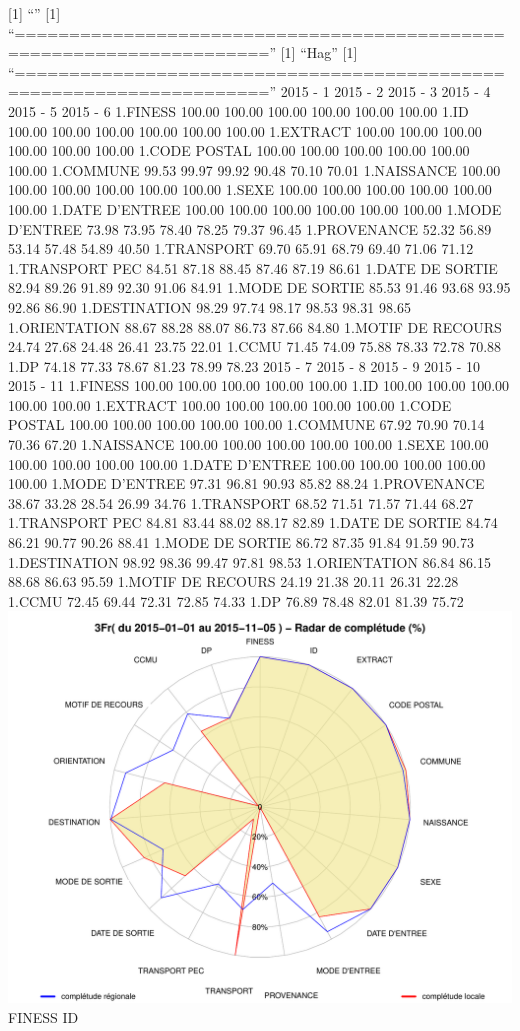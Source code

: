 \documentclass[]{article}
\begin{document}
{[}1{]} ``'' {[}1{]}
``=====================================================================''
{[}1{]} ``Hag'' {[}1{]}
``=====================================================================''
2015 - 1 2015 - 2 2015 - 3 2015 - 4 2015 - 5 2015 - 6 1.FINESS 100.00
100.00 100.00 100.00 100.00 100.00 1.ID 100.00 100.00 100.00 100.00
100.00 100.00 1.EXTRACT 100.00 100.00 100.00 100.00 100.00 100.00 1.CODE
POSTAL 100.00 100.00 100.00 100.00 100.00 100.00 1.COMMUNE 99.53 99.97
99.92 90.48 70.10 70.01 1.NAISSANCE 100.00 100.00 100.00 100.00 100.00
100.00 1.SEXE 100.00 100.00 100.00 100.00 100.00 100.00 1.DATE D'ENTREE
100.00 100.00 100.00 100.00 100.00 100.00 1.MODE D'ENTREE 73.98 73.95
78.40 78.25 79.37 96.45 1.PROVENANCE 52.32 56.89 53.14 57.48 54.89 40.50
1.TRANSPORT 69.70 65.91 68.79 69.40 71.06 71.12 1.TRANSPORT PEC 84.51
87.18 88.45 87.46 87.19 86.61 1.DATE DE SORTIE 82.94 89.26 91.89 92.30
91.06 84.91 1.MODE DE SORTIE 85.53 91.46 93.68 93.95 92.86 86.90
1.DESTINATION 98.29 97.74 98.17 98.53 98.31 98.65 1.ORIENTATION 88.67
88.28 88.07 86.73 87.66 84.80 1.MOTIF DE RECOURS 24.74 27.68 24.48 26.41
23.75 22.01 1.CCMU 71.45 74.09 75.88 78.33 72.78 70.88 1.DP 74.18 77.33
78.67 81.23 78.99 78.23 2015 - 7 2015 - 8 2015 - 9 2015 - 10 2015 - 11
1.FINESS 100.00 100.00 100.00 100.00 100.00 1.ID 100.00 100.00 100.00
100.00 100.00 1.EXTRACT 100.00 100.00 100.00 100.00 100.00 1.CODE POSTAL
100.00 100.00 100.00 100.00 100.00 1.COMMUNE 67.92 70.90 70.14 70.36
67.20 1.NAISSANCE 100.00 100.00 100.00 100.00 100.00 1.SEXE 100.00
100.00 100.00 100.00 100.00 1.DATE D'ENTREE 100.00 100.00 100.00 100.00
100.00 1.MODE D'ENTREE 97.31 96.81 90.93 85.82 88.24 1.PROVENANCE 38.67
33.28 28.54 26.99 34.76 1.TRANSPORT 68.52 71.51 71.57 71.44 68.27
1.TRANSPORT PEC 84.81 83.44 88.02 88.17 82.89 1.DATE DE SORTIE 84.74
86.21 90.77 90.26 88.41 1.MODE DE SORTIE 86.72 87.35 91.84 91.59 90.73
1.DESTINATION 98.92 98.36 99.47 97.81 98.53 1.ORIENTATION 86.84 86.15
88.68 86.63 95.59 1.MOTIF DE RECOURS 24.19 21.38 20.11 26.31 22.28
1.CCMU 72.45 69.44 72.31 72.85 74.33 1.DP 76.89 78.48 82.01 81.39 75.72
\includegraphics{completude_files/figure-latex/finess-7.pdf} FINESS ID
\end{document}
